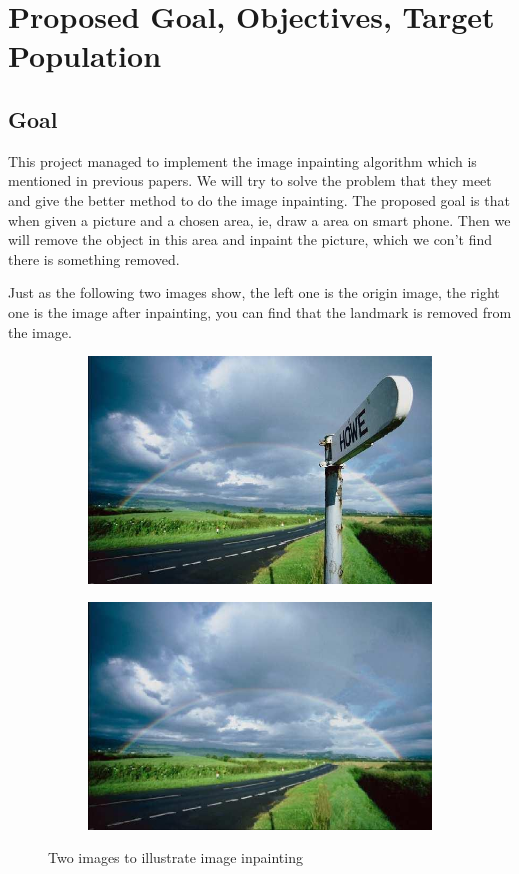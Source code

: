 \documentclass[12pt]{article}
\begin{document}
\section{Proposed Goal, Objectives, Target Population}
\subsection{Goal}
\qquad This project managed to implement the image inpainting algorithm which is mentioned in previous papers. We will try to solve the problem that they meet and give the better method to do the image inpainting. The proposed goal is that when given a picture and a chosen area, ie, draw a area on smart phone. Then we will remove the object in this area and inpaint the picture, which we con't find there is something removed.

\qquad Just as the following two images show, the left one is the origin image, the right one is the image after inpainting, you can find that the landmark is removed from the image.

\begin{figure}[H]
	\begin{subfigure}[pos]{.5\textwidth}
		\centering
		\includegraphics*[width=0.8\linewidth]{1.jpg}
	\end{subfigure}%
	\begin{subfigure}[pos]{.5\textwidth}
		\centering
		\includegraphics*[width=0.8\linewidth]{2.jpg}
	\end{subfigure}%
	\caption{Two images to illustrate image inpainting}
\end{figure}
 
\end{document}
